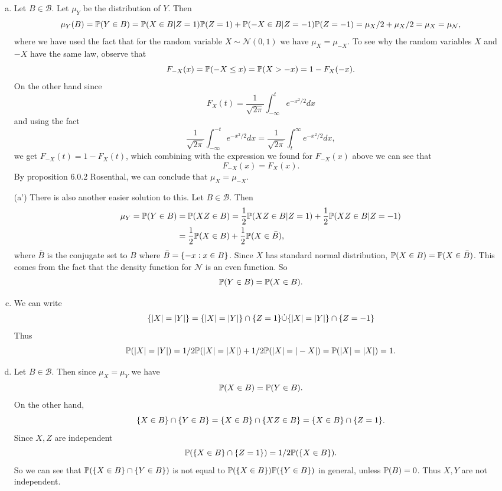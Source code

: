 \begin{solution}
	\begin{enumerate}[(a)]
		\item Let $ B \in \mathcal{B} $. Let $ \mu_Y $ be the distribution of $ Y $. Then
		\[ \mu_Y(B) = \mathbb{P}(Y \in B) = \mathbb{P}(X\in B|Z = 1)\mathbb{P}(Z=1) + \mathbb{P}(-X\in B| Z=-1)\mathbb{P}(Z=-1) = \mu_X/2 + \mu_X/2 = \mu_X = \mu_\mathcal{N},  \]
		where we have used the fact that for the random variable $ X \sim \mathcal{N}(0,1)$ we have $ \mu_{X} = \mu_{-X}. $ To see why the random variables $ X $ and $ -X $ have the same law, observe that
		\[ F_{-X}(x) = \mathbb{P}(-X\leq x) = \mathbb{P}(X > -x) = 1 - F_X(-x). \]
		On the other hand since
		\[ F_X(t) = \frac{1}{\sqrt{2\pi}}\int_{-\infty}^{t} e^{-x^2/2} dx \]
		and using the fact
		\[ \frac{1}{\sqrt{2\pi}}\int_{-\infty}^{-t} e^{-x^2/2} dx  = \frac{1}{\sqrt{2\pi}}\int_{t}^{\infty} e^{-x^2/2} dx, \]
		we get $ F_{-X}(t) = 1- F_X(t) $, which combining with the expression we found for $ F_{-X}(x) $ above we can see that
		\[ F_{-X}(x) = F_X(x). \]
		By proposition 6.0.2 Rosenthal, we can conclude that $ \mu_X = \mu_{-X} $.
		
		\item[(a')] There is also another easier solution to this. Let $ B\in\mathcal{B} $. Then
		\begin{align*}
			\mu_Y = \mathbb{P}(Y \in B) &= \mathbb{P}(XZ \in B) = \frac{1}{2} \mathbb{P}(XZ \in B | Z = 1) + \frac{1}{2} \mathbb{P}(XZ \in B | Z = -1) \\
			&= \frac{1}{2} \mathbb{P}(X \in B) + \frac{1}{2} \mathbb{P}(X \in \bar{B}),
		\end{align*}
		where $ \bar{B} $ is the conjugate set to $ B $ where $ \bar{B} = \{-x: x\in B\} $. Since $ X $ has standard normal distribution, $ \mathbb{P}(X\in B) = \mathbb{P}(X\in\bar{B}) $. This comes from the fact that the density function for $ \mathcal{N} $ is an even function. So
		\[ \mathbb{P}(Y\in B) = \mathbb{P}(X\in B). \]
		
		\item We can write
		\begin{align*} 
			\{|X|=|Y|\} = \{|X| = |Y|\}\cap\{Z=1\} \dot\cup \{|X| = |Y|\}\cap\{Z=-1\}
		\end{align*}
		Thus
		\[ \mathbb{P}(|X|=|Y|) = 1/2\mathbb{P}(|X|=|X|) + 1/2 \mathbb{P}(|X| = |-X|) = \mathbb{P}(|X|=|X|) = 1. \]
		
		\item Let $ B \in \mathcal{B} $. Then since $ \mu_X = \mu_Y $ we have
		\[ \mathbb{P}(X\in B) = \mathbb{P}(Y\in B). \]
		On the other hand, 
		\[ \{X\in B\}\cap \{Y\in B\} = \{X\in B\} \cap \{XZ\in B\} = \{X\in B\}\cap \{Z=1\}. \]
		Since $ X,Z $ are independent
		\[ \mathbb{P}(\{X\in B\}\cap \{Z=1\}) = 1/2\mathbb{P}(\{X\in B\}). \]
		So we can see that $ \mathbb{P}(\{X\in B\}\cap\{Y\in B\})$ is not equal to $ \mathbb{P}(\{X\in B\})\mathbb{P}(\{Y\in B\}) $ in general, unless $ \mathbb{P}(B) = 0$. Thus $ X,Y $ are not independent. 
		

\end{enumerate}
\end{solution}

